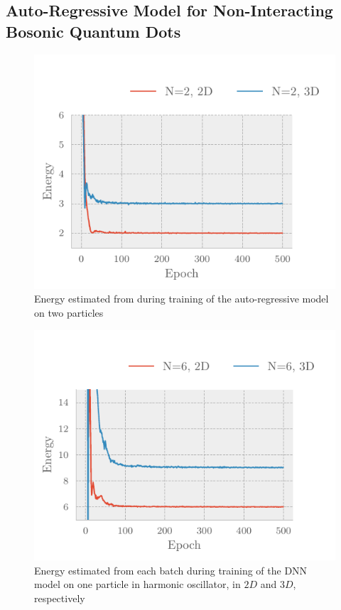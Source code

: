 \subsection{Auto-Regressive Model for Non-Interacting Bosonic Quantum Dots}
\begin{figure}[H]
	\includegraphics[]{figures/many_part_nonint_training1.pdf}
	\caption{Energy estimated from  during training of the auto-regressive model on two particles }
	\label{fig:many_part_nonint_training1}
\end{figure}

\begin{figure}[H]
	\includegraphics[]{figures/many_part_nonint_training2.pdf}
	\caption{Energy estimated from each batch during training of the DNN model on one particle in harmonic oscillator, in $2D$ and $3D$, respectively}
	\label{fig:many_part_nonint_training1}
\end{figure}


